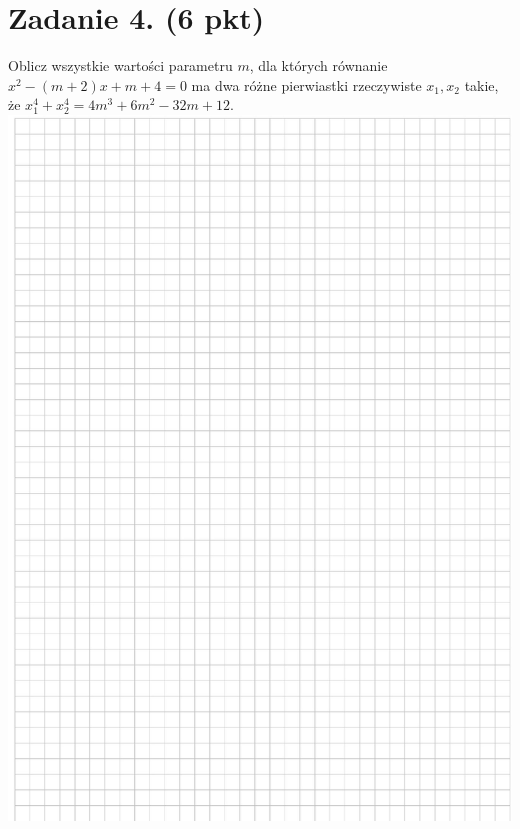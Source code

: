 \documentclass[10pt]{article}
\begin{document}
\section*{Zadanie 4. (6 pkt)}
Oblicz wszystkie wartości parametru \(m\), dla których równanie \(x^{2}-(m+2) x+m+4=0\) ma dwa różne pierwiastki rzeczywiste \(x_{1}, x_{2}\) takie, że \(x_{1}^{4}+x_{2}^{4}=4 m^{3}+6 m^{2}-32 m+12\).\\
\includegraphics[max width=\textwidth, center]{2024_11_21_606d6e4e152fe3e9f6feg-06}\\
\end{document}
